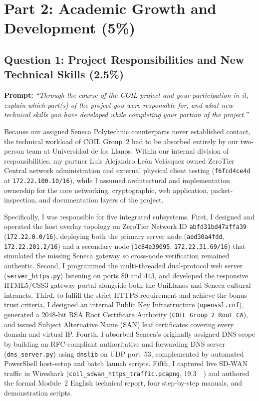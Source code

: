 \section{Part 2: Academic Growth and Development (5\%)}

\subsection{Question 1: Project Responsibilities and New Technical Skills (2.5\%)}

\begin{tcolorbox}[
    colback=LightPanel,
    colframe=BorderGray,
    boxrule=0.7pt,
    arc=3pt,
    left=9pt,
    right=9pt,
    top=6pt,
    bottom=6pt
]
\textbf{Prompt:} \textit{``Through the course of the COIL project and your participation in it, explain which part(s) of the project you were responsible for, and what new technical skills you have developed while completing your portion of the project.''}
\end{tcolorbox}

Because our assigned Seneca Polytechnic counterparts never established contact, the technical workload of COIL Group~2 had to be absorbed entirely by our two-person team at Universidad de los Llanos. Within our internal division of responsibilities, my partner Luis Alejandro Le\'on Vel\'asquez owned ZeroTier Central network administration and external physical client testing (\texttt{f6fcd4ce4d} at \texttt{172.22.100.10/16}), while I assumed architectural and implementation ownership for the core networking, cryptographic, web application, packet-inspection, and documentation layers of the project.

Specifically, I was responsible for five integrated subsystems. First, I designed and operated the host overlay topology on ZeroTier Network ID \texttt{abfd31bd47affa39} (\texttt{172.22.0.0/16}), deploying both the primary server node (\texttt{aed30a4fdd}, \texttt{172.22.201.2/16}) and a secondary node (\texttt{1c84e39095}, \texttt{172.22.31.69/16}) that simulated the missing Seneca gateway so cross-node verification remained authentic. Second, I programmed the multi-threaded dual-protocol web server (\texttt{server\_https.py}) listening on ports 80 and 443, and developed the responsive HTML5/CSS3 gateway portal alongside both the UniLlanos and Seneca cultural intranets. Third, to fulfill the strict HTTPS requirement and achieve the bonus trust criteria, I designed an internal Public Key Infrastructure (\texttt{openssl.cnf}), generated a 2048-bit RSA Root Certificate Authority (\texttt{COIL Group 2 Root CA}), and issued Subject Alternative Name (SAN) leaf certificates covering every domain and virtual IP. Fourth, I absorbed Seneca's originally assigned DNS scope by building an RFC-compliant authoritative and forwarding DNS server (\texttt{dns\_server.py}) using \texttt{dnslib} on UDP port~53, complemented by automated PowerShell host-setup and batch launch scripts. Fifth, I captured live SD-WAN traffic in Wireshark (\texttt{coil\_sdwan\_https\_traffic.pcapng}, \SI{19.3}{\kilo\byte}) and authored the formal Module~2 English technical report, four step-by-step manuals, and demonstration scripts.

